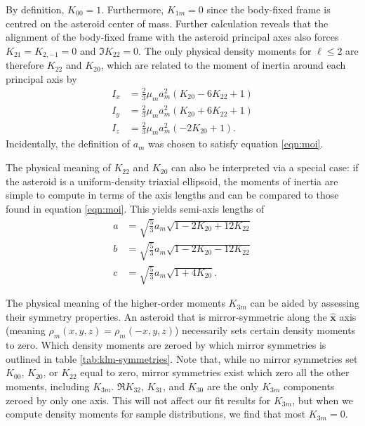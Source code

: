 \documentclass[fleqn,usenatbib]{mnras}
\newcommand{\unit}[1]{\bm{\hat{#1}}}
\newcommand{\parens}[1]{\left( #1 \right)}
\begin{document}
By definition, $K_{00}=1$. Furthermore, $K_{1m} = 0$ since the body-fixed frame is centred on the asteroid center of mass. Further calculation reveals that the alignment of the body-fixed frame with the asteroid principal axes also forces $K_{21}=K_{2,-1} = 0$ and $\Im K_{22}=0$. The only physical density moments for $\ell \leq 2$ are therefore $K_{22}$ and $K_{20}$, which are related to the moment of inertia around each principal axis by
\begin{equation}
  \begin{split}
    I_x &= \frac{2}{3}\mu_m a_m^2 \parens{K_{20} - 6 K_{22} + 1}\\
    I_y &= \frac{2}{3}\mu_m a_m^2 \parens{K_{20} + 6 K_{22} + 1}\\
    I_z &= \frac{2}{3}\mu_m a_m^2 \parens{-2K_{20} + 1}.
  \end{split}
  \label{eqn:moi}
\end{equation}
Incidentally, the definition of $a_m$ was chosen to satisfy equation \ref{eqn:moi}.

The physical meaning of $K_{22}$ and $K_{20}$ can also be interpreted via a special case: if the asteroid is a uniform-density triaxial ellipsoid, the moments of inertia are simple to compute in terms of the axis lengths and can be compared to those found in equation \ref{eqn:moi}. This yields semi-axis lengths of 
\begin{equation}
  \begin{split}
  a &= \sqrt{\frac{5}{3}}a_m\sqrt{1-2K_{20}+12K_{22}}\\
  b &= \sqrt{\frac{5}{3}}a_m\sqrt{1-2K_{20}-12K_{22}}\\
  c &= \sqrt{\frac{5}{3}}a_m\sqrt{1+4K_{20}}.
  \label{eqn:ellipsoid-axes}
  \end{split}
\end{equation}

The physical meaning of the higher-order moments $K_{3m}$ can be aided by assessing their symmetry properties. An asteroid that is mirror-symmetric along the $\unit{x}$ axis (meaning $\rho_m(x,y,z)=\rho_m(-x,y,z)$) necessarily sets certain density moments to zero. Which density moments are zeroed by which mirror symmetries is outlined in table \ref{tab:klm-symmetries}. Note that, while no mirror symmetries set $K_{00}$, $K_{20}$, or $K_{22}$ equal to zero, mirror symmetries exist which zero all the other moments, including $K_{3m}$. $\Re K_{32}$, $K_{31}$, and $K_{30}$ are the only $K_{3m}$ components zeroed by only one axis. This will not affect our fit results for $K_{3m}$, but when we compute density moments for sample distributions, we find that most $K_{3m}=0$.
\end{document}
